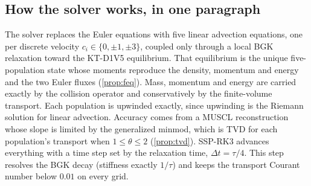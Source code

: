 \subsection{How the solver works, in one paragraph}
The solver replaces the Euler equations with five linear advection equations, one
per discrete velocity $c_i\in\{0,\pm1,\pm3\}$, coupled only through a local BGK
relaxation toward the KT-D1V5 equilibrium.  That equilibrium is the unique
five-population state whose moments reproduce the density, momentum and energy and
the two Euler fluxes (\cref{prop:feq}).  Mass, momentum and energy are carried
exactly by the collision operator and conservatively by the finite-volume
transport.  Each population is upwinded exactly, since upwinding is the Riemann
solution for linear advection.  Accuracy comes from a MUSCL reconstruction whose
slope is limited by the generalized minmod, which is TVD for each population's
transport when $1\le\theta\le2$ (\cref{prop:tvd}).  SSP-RK3 advances everything with a
time step set by the relaxation time, $\Delta t=\tau/4$.  This step resolves the
BGK decay (stiffness exactly $1/\tau$) and keeps the transport Courant number below
$0.01$ on every grid.

